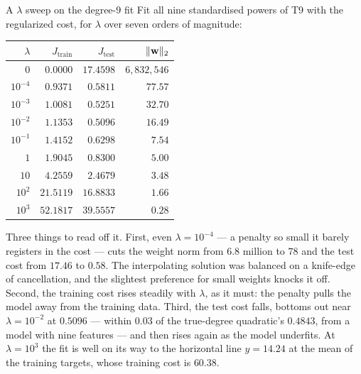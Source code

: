 \begin{workedexample}{A $\lambda$ sweep on the degree-9 fit}
Fit all nine standardised powers of T9 with the regularized cost, for $\lambda$
over seven orders of magnitude:

\begin{center}
\small
\renewcommand{\arraystretch}{1.15}
\begin{tabular}{@{}rrrr@{}}
\toprule
$\lambda$ & $J_{\text{train}}$ & $J_{\text{test}}$ & $\|\mathbf{w}\|_2$\\
\midrule
$0$         & $0.0000$  & $17.4598$ & $6{,}832{,}546$\\
$10^{-4}$   & $0.9371$  & $0.5811$  & $77.57$\\
$10^{-3}$   & $1.0081$  & $0.5251$  & $32.70$\\
$10^{-2}$   & $1.1353$  & $\mathbf{0.5096}$ & $16.49$\\
$10^{-1}$   & $1.4152$  & $0.6298$  & $7.54$\\
$1$         & $1.9045$  & $0.8300$  & $5.00$\\
$10$        & $4.2559$  & $2.4679$  & $3.48$\\
$10^{2}$    & $21.5119$ & $16.8833$ & $1.66$\\
$10^{3}$    & $52.1817$ & $39.5557$ & $0.28$\\
\bottomrule
\end{tabular}
\end{center}

Three things to read off it. First, even $\lambda = 10^{-4}$ --- a penalty so
small it barely registers in the cost --- cuts the weight norm from $6.8$ million
to $78$ and the test cost from $17.46$ to $0.58$. The interpolating solution was
balanced on a knife-edge of cancellation, and the slightest preference for small
weights knocks it off. Second, the training cost rises steadily with $\lambda$,
as it must: the penalty pulls the model away from the training data. Third, the
test cost falls, bottoms out near $\lambda = 10^{-2}$ at $0.5096$ --- within
$0.03$ of the true-degree quadratic's $0.4843$, from a model with nine
features --- and then rises again as the model underfits. At $\lambda = 10^3$ the
fit is well on its way to the horizontal line $y = 14.24$ at the mean of the
training targets, whose training cost is $60.38$.
\end{workedexample}

